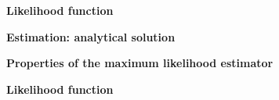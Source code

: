 \documentclass[notes,blackandwhite,mathsans]{beamer}
\begin{document}
{
\begin{frame}

\vspace{1.5cm} \textbf{\color{mcxs3}Likelihood function}

\bigskip\textbf{\color{mcxs1}Estimation: analytical solution}

\bigskip\textbf{\color{mcxs3}Properties of the maximum likelihood estimator}




\end{frame}
}



%
%
%






{
\begin{frame}

\begin{adjustwidth}{-0.5cm}{0cm}
\vspace{8.3cm}\Large
\textbf{{\color{mcxs1}Likelihood} {\color{mcxs2}function}}
\end{adjustwidth}

\end{frame}
}
\end{document}
